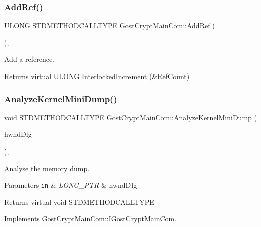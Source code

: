 \subsubsection{\texorpdfstring{Add\+Ref()}{AddRef()}}
{\footnotesize\ttfamily U\+L\+O\+NG S\+T\+D\+M\+E\+T\+H\+O\+D\+C\+A\+L\+L\+T\+Y\+PE Gost\+Crypt\+Main\+Com\+::\+Add\+Ref (\begin{DoxyParamCaption}{ }\end{DoxyParamCaption})\hspace{0.3cm}{\ttfamily [inline]}, {\ttfamily [virtual]}}



Add a reference. 

\begin{DoxyReturn}{Returns}
virtual U\+L\+O\+NG Interlocked\+Increment (\&Ref\+Count) 
\end{DoxyReturn}
\mbox{\label{class_gost_crypt_main_com_aaf1b9fb1912523bdca4f2304839445c0}} 
\subsubsection{\texorpdfstring{Analyze\+Kernel\+Mini\+Dump()}{AnalyzeKernelMiniDump()}}
{\footnotesize\ttfamily void S\+T\+D\+M\+E\+T\+H\+O\+D\+C\+A\+L\+L\+T\+Y\+PE Gost\+Crypt\+Main\+Com\+::\+Analyze\+Kernel\+Mini\+Dump (\begin{DoxyParamCaption}\item[{L\+O\+N\+G\+\_\+\+P\+TR}]{hwnd\+Dlg }\end{DoxyParamCaption})\hspace{0.3cm}{\ttfamily [inline]}, {\ttfamily [virtual]}}



Analyse the memory dump. 


\begin{DoxyParams}[1]{Parameters}
\mbox{\tt in}  & {\em L\+O\+N\+G\+\_\+\+P\+TR} & hwnd\+Dlg \\
\hline
\end{DoxyParams}
\begin{DoxyReturn}{Returns}
virtual void S\+T\+D\+M\+E\+T\+H\+O\+D\+C\+A\+L\+L\+T\+Y\+PE 
\end{DoxyReturn}


Implements \hyperlink{interface_gost_crypt_main_com_1_1_i_gost_crypt_main_com}{Gost\+Crypt\+Main\+Com\+::\+I\+Gost\+Crypt\+Main\+Com}.

